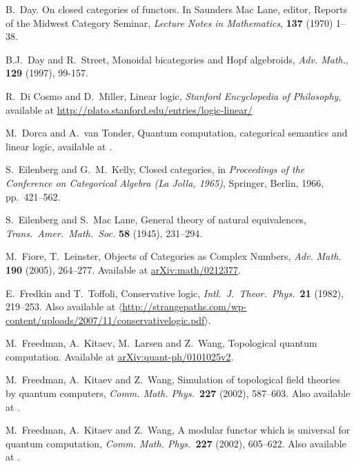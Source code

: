 \documentclass[12pt,twoside,openright]{report}
\begin{document}
\begin{thebibliography}{99}
 B.\ Day. On closed categories of functors. In Saunders Mac Lane, editor, Reports of the Midwest Category Seminar, {\sl Lecture Notes in Mathematics}, \textbf{137} (1970) 1--38.

 B.J.\ Day and R.\ Street, Monoidal bicategories and Hopf algebroids, \textsl{Adv. Math.}, \textbf{129} (1997), 99-157.

 R.\ Di Cosmo and D.\ Miller, Linear logic,
{\sl Stanford Encyclopedia of Philosophy}, available at 
\href{http://plato.stanford.edu/entries/logic-linear/}
{http://plato.stanford.edu/entries/logic-linear/}

 M.\ Dorca and A.\ van Tonder, Quantum computation, categorical semantics and linear logic, available at .
 
S.\ Eilenberg and G.\ M.\ Kelly, Closed categories, in
{\sl Proceedings of the Conference on Categorical Algebra (La Jolla, 
1965)}, Springer, Berlin, 1966, pp.\ 421--562.

S.\ Eilenberg and S.\ Mac Lane, General theory of natural equivalences, \textsl{Trans.\ Amer.\ Math.\ Soc.} 
\textbf{58} (1945), 231--294.

 M.\ Fiore, T.\ Leinster, Objects of Categories as Complex Numbers, \textsl{Adv. Math.} \textbf{190} (2005), 264--277.  Available at \href{http://arxiv.org/abs/math/0212377}{arXiv:math/0212377}.

 E.\ Fredkin and T.\ Toffoli, Conservative logic, 
\textit{Intl.\ J.\ Theor.\ Phys.\ }\textbf{21} (1982), 219--253. Also available at 
\hfill \break
\href{http://strangepaths.com/wp-content/uploads/2007/11/conservativelogic.pdf}
{$\langle$http://strangepaths.com/wp-content/uploads/2007/11/conservativelogic.pdf$\rangle$}.

 M.\ Freedman, A.\ Kitaev, M.\ Larsen and Z.\ Wang, Topological quantum computation.  Available at \href{http://arxiv.org/abs/quant-ph/0101025}{arXiv:quant-ph/0101025v2}.

 M.\ Freedman, A.\ Kitaev and Z.\ Wang, Simulation of topological field theories by quantum computers, {\sl Comm. Math. Phys.\ }{\bf 227}
(2002), 587--603.  Also available at .

M.\ Freedman, A.\ Kitaev and Z.\ Wang, A modular functor which is universal for quantum computation, {\sl Comm. Math. Phys.\ }{\bf 227}
(2002), 605--622.  Also available at .


\end{thebibliography}
\end{document}

